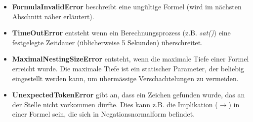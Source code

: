 \documentclass[11pt,a4paper,ngerman]{scrreprt}
\begin{document}
\begin{itemize}
 \item \textbf{FormulaInvalidError} beschreibt eine ungültige Formel (wird im nächsten Abschnitt näher erläutert).
 \item \textbf{TimeOutError} entsteht wenn ein Berechnungsprozess (z.B. \textit{sat()}) eine festgelegte Zeitdauer (üblicherweise 5 Sekunden) überschreitet.
 \item \textbf{MaximalNestingSizeError} entsteht, wenn die maximale Tiefe einer Formel erreicht wurde. Die maximale Tiefe ist ein statischer Parameter, der beliebig eingestellt werden kann, um übermässige Verschachtelungen zu vermeiden.
 \item \textbf{UnexpectedTokenError} gibt an, dass ein Zeichen gefunden wurde, das an der Stelle nicht vorkommen dürfte. Dies kann z.B. die Implikation ($\rightarrow$) in einer Formel sein, die sich in Negationsnormalform befindet.
\end{itemize}
\end{document}
